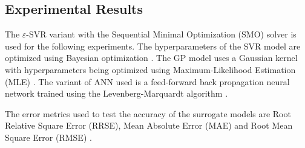 \documentclass[10pt, a4paper, conference, compsocconf]{IEEEtran}
\begin{document}



\subsection{Experimental Results}
The $\varepsilon$-SVR variant \cite{basak2007support} with the Sequential Minimal Optimization (SMO) \cite{platt1998sequential} solver is used for the following experiments. The hyperparameters of the SVR model are optimized using Bayesian optimization \cite{snoek2012practical}. The GP model uses a Gaussian kernel with hyperparameters being optimized using Maximum-Likelihood Estimation (MLE) \cite{rasmussen2006gaussian}. The variant of ANN used is a feed-forward back propagation neural network \cite{haykin2009neural} trained using the Levenberg-Marquardt algorithm \cite{demuth2014neural}.

The error metrics used to test the accuracy of the surrogate models are Root Relative Square Error (RRSE), Mean Absolute Error (MAE) and Root Mean Square Error (RMSE) \cite{graczyk2009comparative}.
\end{document}
